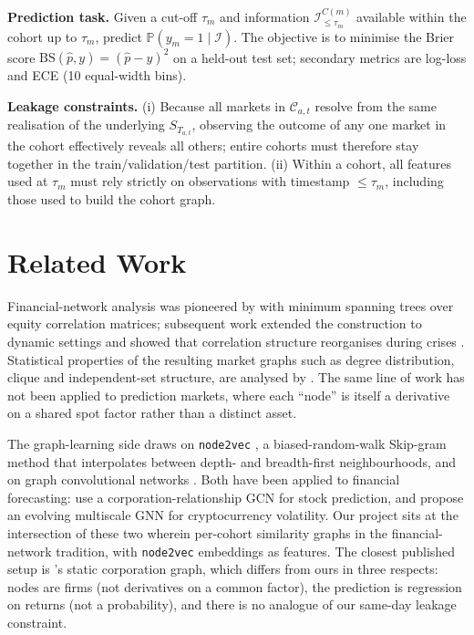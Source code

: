 \documentclass{article} %
\begin{document}
\textbf{Prediction task.} Given a cut-off $\tau_m$ and information $\mathcal{I}_{\le \tau_m}^{C(m)}$ available within the cohort up to $\tau_m$, predict $\mathbb{P}(y_m = 1 \mid \mathcal{I})$. The objective is to minimise the Brier score $\mathrm{BS}(\hat{p}, y) = (\hat{p}-y)^2$ on a held-out test set; secondary metrics are log-loss and ECE (10 equal-width bins).

\textbf{Leakage constraints.} (i) Because all markets in $\mathcal{C}_{a,t}$ resolve from the same realisation of the underlying $S_{T_{a,t}}$, observing the outcome of any one market in the cohort effectively reveals all others; entire cohorts must therefore stay together in the train/validation/test partition. (ii) Within a cohort, all features used at $\tau_m$ must rely strictly on observations with timestamp $\le \tau_m$, including those used to build the cohort graph.

\section{Related Work}

Financial-network analysis was pioneered by \citet{mantegna1999} with minimum spanning trees over equity correlation matrices; subsequent work extended the construction to dynamic settings and showed that correlation structure reorganises during crises \citep{onnela2003, isogai2017, fenn2012}. Statistical properties of the resulting market graphs such as degree distribution, clique and independent-set structure, are analysed by \citet{boginski2005}. The same line of work has not been applied to prediction markets, where each ``node'' is itself a derivative on a shared spot factor rather than a distinct asset.

The graph-learning side draws on \texttt{node2vec} \citep{grover2016}, a biased-random-walk Skip-gram method that interpolates between depth- and breadth-first neighbourhoods, and on graph convolutional networks \citep{kipf2017}. Both have been applied to financial forecasting: \citet{chen2018} use a corporation-relationship GCN for stock prediction, and \citet{zhou2025} propose an evolving multiscale GNN for cryptocurrency volatility. Our project sits at the intersection of these two wherein per-cohort similarity graphs in the financial-network tradition, with \texttt{node2vec} embeddings as features. The closest published setup is \citet{chen2018}'s static corporation graph, which differs from ours in three respects: nodes are firms (not derivatives on a common factor), the prediction is regression on returns (not a probability), and there is no analogue of our same-day leakage constraint.
\end{document}
